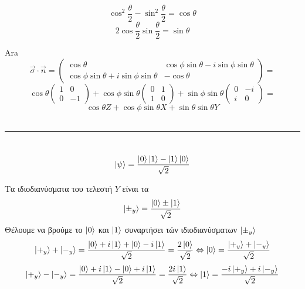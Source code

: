 \documentclass[12pt]{article}
\begin{document}
$$ \cos^2\frac{\theta}{2} - \sin^2\frac{\theta}{2} = \cos\theta$$
$$ 2\cos{\frac{\theta}{2}}\sin{\frac{\theta}{2}} = \sin\theta $$

Ara 
$$\vec{\sigma}\cdot \vec{n} =  \begin{pmatrix}\cos\theta & \cos\phi \sin\theta - i \sin\phi \sin\theta \\ \cos\phi \sin\theta + i \sin\phi \sin\theta &-\cos\theta \end{pmatrix} =$$
$$ \cos\theta \begin{pmatrix}
    1&0\\0&-1
\end{pmatrix} + \cos\phi \sin\theta \begin{pmatrix}
    0&1\\1&0
\end{pmatrix} + \sin\phi \sin\theta \begin{pmatrix}
    0&-i\\i&0
\end{pmatrix} = $$
$$\cos\theta Z + \cos\phi\sin\theta X + \sin\theta\sin\theta Y$$\\
\rule{\textwidth}{.5pt}
\section*{{}}
$$ \ket{\psi} = \frac{\ket{0}\ket{1} - \ket{1}\ket{0}}{\sqrt{2}}$$

Τα ιδιοδιανύσματα του τελεστή $Y$ είναι τα 
$$\ket{\pm _y} = \frac{\ket{0} \pm \ket{1}}{\sqrt{2}}$$ 
Θέλουμε να βρούμε το $\ket{0}$ και $\ket{1}$ συναρτήσει τών ιδιοδιανύσματων $\ket{\pm _y}$ 
$$\ket{+_y} + \ket{-_y} = \frac{\ket{0} + i\ket{1}+\ket{0} - i\ket{1}}{\sqrt{2}}  = \frac{2\ket{0}}{\sqrt{2}} \Leftrightarrow \ket{0} = \frac{\ket{+_y} + \ket{-_y}}{\sqrt{2}} $$
$$\ket{+_y} - \ket{-_y} = \frac{\ket{0} + i\ket{1}-\ket{0} + i\ket{1}}{\sqrt{2}}  = \frac{2i\ket{1}}{\sqrt{2}} \Leftrightarrow \ket{1} = \frac{-i\ket{+_y} +i\ket{-_y}}{\sqrt{2}} $$
\end{document}
